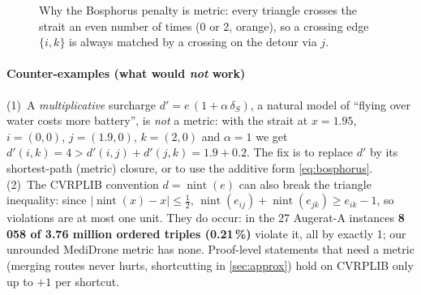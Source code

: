\begin{figure}[t]
\centering
{}
\caption{Why the Bosphorus penalty is metric: every triangle crosses the strait an even number of
times (0 or 2, orange), so a crossing edge $\{i,k\}$ is always matched by a crossing on the detour via $j$.}
\label{fig:cut}
\end{figure}

\paragraph{Counter-examples (what would \emph{not} work)}
(1)~A \emph{multiplicative} surcharge $d'=e\,(1+\alpha\,\delta_S)$, a natural model of ``flying over water
costs more battery'', is \emph{not} a metric: with the strait at $x=1.95$, $i=(0,0)$, $j=(1.9,0)$,
$k=(2,0)$ and $\alpha=1$ we get $d'(i,k)=4>d'(i,j)+d'(j,k)=1.9+0.2$. The fix is to replace $d'$ by its
shortest-path (metric) closure, or to use the additive form \eqref{eq:bosphorus}.
(2)~The CVRPLIB convention $d=\operatorname{nint}(e)$ can also break the triangle inequality: since
$|\operatorname{nint}(x)-x|\le\tfrac12$, $\operatorname{nint}(e_{ij})+\operatorname{nint}(e_{jk})\ge e_{ik}-1$,
so violations are at most one unit. They do occur: in the 27 Augerat-A instances
\textbf{8\,058 of 3.76 million ordered triples (0.21\,\%)} violate it, all by exactly 1; our unrounded
MediDrone metric has none. Proof-level statements that need a metric (merging routes never hurts,
shortcutting in \cref{sec:approx}) hold on CVRPLIB only up to $+1$ per shortcut.

